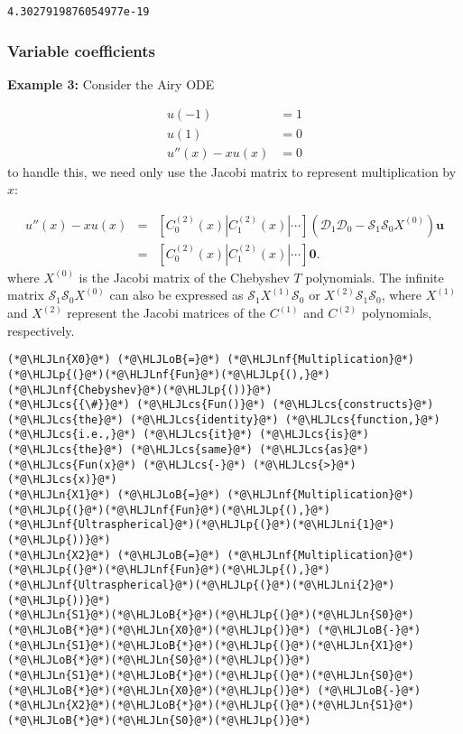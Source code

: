 \documentclass[12pt,a4paper]{article}
\newcommand{\HLJLn}[1]{#1}
\newcommand{\HLJLnf}[1]{\textcolor[RGB]{66,102,213}{#1}}
\newcommand{\HLJLni}[1]{\textcolor[RGB]{59,151,46}{#1}}
\newcommand{\HLJLoB}[1]{\textcolor[RGB]{102,102,102}{\textbf{#1}}}
\newcommand{\HLJLp}[1]{#1}
\newcommand{\HLJLcs}[1]{\textcolor[RGB]{153,153,119}{\textit{#1}}}
\begin{document}
\begin{lstlisting}
4.3027919876054977e-19
\end{lstlisting}


\subsubsection{Variable coefficients}
\textbf{Example 3:} Consider the Airy ODE


\begin{align*}
u(-1) &= 1\\
u(1) &= 0\\
u''(x) - xu(x) &= 0
\end{align*}
to handle this, we need only use the Jacobi matrix to represent multiplication by $x$:


\begin{eqnarray*}
u''(x) - xu(x)  &=& \left[ C_0^{(2)}(x) | C_1^{(2)}(x) | \cdots \right]\left(\mathcal{D}_1\mathcal{D}_0  - \mathcal{S}_1\mathcal{S}_0X^{(0)}   \right) \mathbf{u} \\
 &=& \left[ C_0^{(2)}(x) | C_1^{(2)}(x) | \cdots \right]\mathbf{0}.
 \end{eqnarray*}
where $X^{(0)}$ is the Jacobi matrix of the Chebyshev $T$ polynomials. The infinite matrix $\mathcal{S}_1\mathcal{S}_0X^{(0)}$ can also be expressed as $\mathcal{S}_1X^{(1)}\mathcal{S}_0$ or $X^{(2)}\mathcal{S}_1\mathcal{S}_0$, where $X^{(1)}$ and $X^{(2)}$ represent the Jacobi matrices of the $C^{(1)}$ and $C^{(2)}$ polynomials, respectively. 


\begin{lstlisting}
(*@\HLJLn{X0}@*) (*@\HLJLoB{=}@*) (*@\HLJLnf{Multiplication}@*)(*@\HLJLp{(}@*)(*@\HLJLnf{Fun}@*)(*@\HLJLp{(),}@*)(*@\HLJLnf{Chebyshev}@*)(*@\HLJLp{())}@*)  
(*@\HLJLcs{{\#}}@*) (*@\HLJLcs{Fun()}@*) (*@\HLJLcs{constructs}@*) (*@\HLJLcs{the}@*) (*@\HLJLcs{identity}@*) (*@\HLJLcs{function,}@*) (*@\HLJLcs{i.e.,}@*) (*@\HLJLcs{it}@*) (*@\HLJLcs{is}@*) (*@\HLJLcs{the}@*) (*@\HLJLcs{same}@*) (*@\HLJLcs{as}@*) (*@\HLJLcs{Fun(x}@*) (*@\HLJLcs{-}@*) (*@\HLJLcs{>}@*) (*@\HLJLcs{x)}@*)
(*@\HLJLn{X1}@*) (*@\HLJLoB{=}@*) (*@\HLJLnf{Multiplication}@*)(*@\HLJLp{(}@*)(*@\HLJLnf{Fun}@*)(*@\HLJLp{(),}@*)(*@\HLJLnf{Ultraspherical}@*)(*@\HLJLp{(}@*)(*@\HLJLni{1}@*)(*@\HLJLp{))}@*)
(*@\HLJLn{X2}@*) (*@\HLJLoB{=}@*) (*@\HLJLnf{Multiplication}@*)(*@\HLJLp{(}@*)(*@\HLJLnf{Fun}@*)(*@\HLJLp{(),}@*)(*@\HLJLnf{Ultraspherical}@*)(*@\HLJLp{(}@*)(*@\HLJLni{2}@*)(*@\HLJLp{))}@*)
(*@\HLJLn{S1}@*)(*@\HLJLoB{*}@*)(*@\HLJLp{(}@*)(*@\HLJLn{S0}@*)(*@\HLJLoB{*}@*)(*@\HLJLn{X0}@*)(*@\HLJLp{)}@*) (*@\HLJLoB{-}@*) (*@\HLJLn{S1}@*)(*@\HLJLoB{*}@*)(*@\HLJLp{(}@*)(*@\HLJLn{X1}@*)(*@\HLJLoB{*}@*)(*@\HLJLn{S0}@*)(*@\HLJLp{)}@*)
(*@\HLJLn{S1}@*)(*@\HLJLoB{*}@*)(*@\HLJLp{(}@*)(*@\HLJLn{S0}@*)(*@\HLJLoB{*}@*)(*@\HLJLn{X0}@*)(*@\HLJLp{)}@*) (*@\HLJLoB{-}@*) (*@\HLJLn{X2}@*)(*@\HLJLoB{*}@*)(*@\HLJLp{(}@*)(*@\HLJLn{S1}@*)(*@\HLJLoB{*}@*)(*@\HLJLn{S0}@*)(*@\HLJLp{)}@*)
\end{lstlisting}
\end{document}
